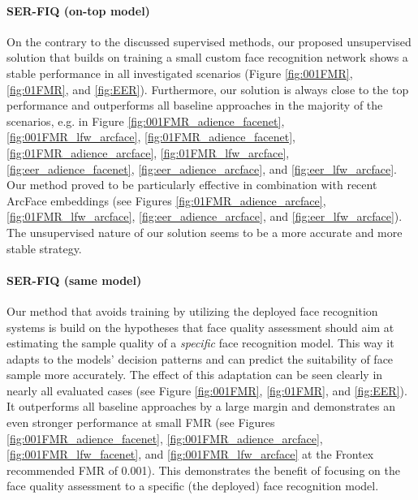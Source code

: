 \documentclass[10pt,twocolumn,letterpaper]{article}
\begin{document}
\paragraph{SER-FIQ (on-top model)}
On the contrary to the discussed supervised methods, our proposed unsupervised solution that builds on training a small custom face recognition network shows a stable performance in all investigated scenarios (Figure \ref{fig:001FMR}, \ref{fig:01FMR}, and \ref{fig:EER}).
Furthermore, our solution is always close to the top performance and outperforms all baseline approaches in the majority of the scenarios, e.g. in Figure \ref{fig:001FMR_adience_facenet}, \ref{fig:001FMR_lfw_arcface}, \ref{fig:01FMR_adience_facenet}, \ref{fig:01FMR_adience_arcface}, \ref{fig:01FMR_lfw_arcface}, \ref{fig:eer_adience_facenet}, \ref{fig:eer_adience_arcface}, and \ref{fig:eer_lfw_arcface}.
Our method proved to be particularly effective in combination with recent ArcFace embeddings (see Figures \ref{fig:01FMR_adience_arcface}, \ref{fig:01FMR_lfw_arcface}, \ref{fig:eer_adience_arcface}, and \ref{fig:eer_lfw_arcface}).
The unsupervised nature of our solution seems to be a more accurate and more stable strategy. 




\paragraph{SER-FIQ (same model)}
Our method that avoids training by utilizing the deployed face recognition systems is build on the hypotheses that face quality assessment should aim at estimating the sample quality of a \textit{specific} face recognition model.
This way it adapts to the models' decision patterns and can predict the suitability of face sample more accurately.
The effect of this adaptation can be seen clearly in nearly all evaluated cases (see Figure \ref{fig:001FMR}, \ref{fig:01FMR}, and \ref{fig:EER}).
It outperforms all baseline approaches by a large margin and demonstrates an even stronger performance at small FMR (see Figures \ref{fig:001FMR_adience_facenet}, \ref{fig:001FMR_adience_arcface}, \ref{fig:001FMR_lfw_facenet}, and \ref{fig:001FMR_lfw_arcface} at the Frontex recommended FMR of 0.001). 
This demonstrates the benefit of focusing on the face quality assessment to a specific (the deployed) face recognition model.
\end{document}
